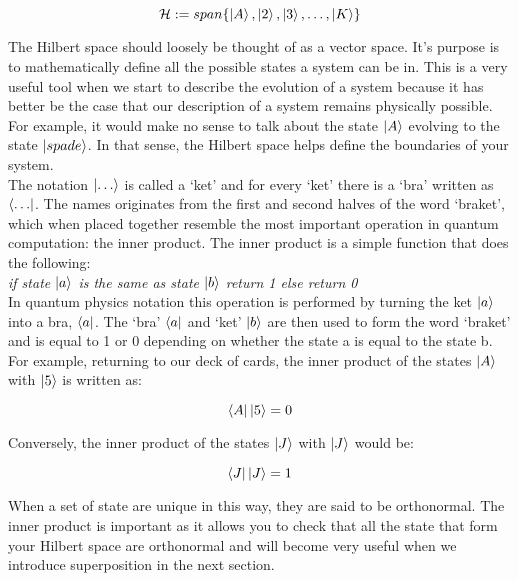 \begin{equation}
\mathcal{H}:=span\{\left\vert{A}\right\rangle, \left\vert{2}\right\rangle, \left\vert{3}\right\rangle,\ldots ,\left\vert{K}\right\rangle\}
\end{equation}

The Hilbert space should loosely be thought of as a vector space. It's purpose is to mathematically define all the possible states a system can be in. This is a very useful tool when we start to describe the evolution of a system because it has better be the case that our description of a system remains physically possible. For example, it would make no sense to talk about the state $\left\vert{A}\right\rangle$ evolving to the state $\left\vert{spade}\right\rangle$. In that sense, the Hilbert space helps define the boundaries of your system.\\

The notation $\left\vert{\ldots}\right\rangle$ is called a `ket' and for every `ket' there is a `bra' written as $\left\langle{\ldots}\right\vert$. The names originates from the first and second halves of the word `braket', which when placed together resemble the most important operation in quantum computation: the inner product. The inner product is a simple function that does the following:\\

\textit{if state $\left\vert{a}\right\rangle$ is the same as state $\left\vert{b}\right\rangle$ return 1 else return 0}\\

In quantum physics notation this operation is performed by turning the ket $\left\vert{a}\right\rangle$ into a bra, $\left\langle{a}\right\vert$. The `bra' $\left\langle{a}\right\vert$ and `ket' $\left\vert{b}\right\rangle$ are then used to form the word `braket' and is equal to 1 or 0 depending on whether the state a is equal to the state b.\\

For example, returning to our deck of cards, the inner product of the states $\left\vert{A}\right\rangle$ with $\left\vert{5}\right\rangle$ is written as:

\begin{equation}
\left\langle{A}\right\vert\left\vert{5}\right\rangle = 0
\end{equation}

Conversely, the inner product of the states $\left\vert{J}\right\rangle$ with $\left\vert{J}\right\rangle$ would be:

\begin{equation}
\left\langle{J}\right\vert\left\vert{J}\right\rangle = 1
\end{equation}

When a set of state are unique in this way, they are said to be orthonormal. The inner product is important as it allows you to check that all the state that form your Hilbert space are orthonormal and will become very useful when we introduce superposition in the next section.

